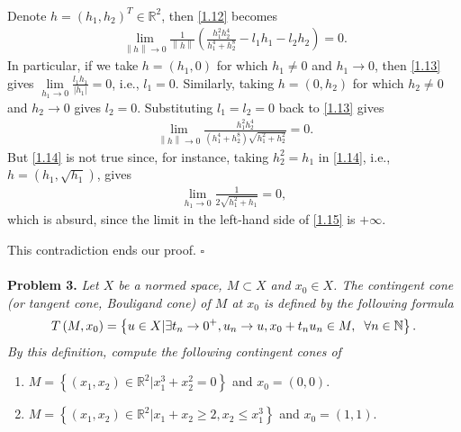\documentclass[a4paper]{article}
\numberwithin{equation}{section}
\begin{document}
\begin{enumerate}
\begin{align}
\end{align}
Denote $h=\left(h_1,h_2\right)^T \in \mathbb{R}^2$, then \eqref{1.12} becomes
\begin{align}
\label{1.13}
\mathop {\lim }\limits_{\left\| h \right\| \to 0} \frac{1}{{\left\| h \right\|}}\left( {\frac{{h_1^2h_2^4}}{{h_1^4 + h_2^8}} - {l_1}{h_1} - {l_2}{h_2}} \right) = 0.
\end{align}
In particular, if we take $h=\left(h_1,0\right)$ for which $h_1 \ne 0$ and $h_1\to 0$, then \eqref{1.13} gives $ \mathop {\lim }\limits_{{h_1} \to 0} \frac{{{l_1}{h_1}}}{{\left| {{h_1}} \right|}} = 0$, i.e., $l_1 =0$. Similarly, taking  $h=\left(0,h_2\right)$ for which $h_2 \ne 0$ and $h_2\to 0$ gives $l_2 =0$. Substituting $l_1=l_2=0$ back to \eqref{1.13} gives
\begin{align}
\label{1.14}
\mathop {\lim }\limits_{\left\| h \right\| \to 0} \frac{{h_1^2h_2^4}}{{\left( {h_1^4 + h_2^8} \right)\sqrt {h_1^2 + h_2^2} }} = 0.
\end{align}
But \eqref{1.14} is not true since, for instance, taking $h_2^2=h_1$ in \eqref{1.14}, i.e., $h=\left(h_1,\sqrt{h_1}\right)$, gives
\begin{align}
\label{1.15}
\mathop {\lim }\limits_{{h_1} \to 0} \frac{1}{{2\sqrt {h_1^2 + {h_1}} }} = 0,
\end{align}
which is absurd, since the limit in the left-hand side of \eqref{1.15} is $+\infty$. 
\end{enumerate}
This contradiction ends our proof. \hfill $\square$\\
\\
\textbf{Problem 3.} \textit{Let $X$ be a normed space, $M\subset X$ and $x_0\in X$. The contingent cone (or tangent cone, Bouligand cone) of $M$ at $x_0$ is defined by the following formula}
\begin{align}
\label{1.16}
T\left( {M,{x_0}} \right) = \left\{ {u \in X|\exists {t_n} \to {0^ + },{u_n} \to u,{x_0} + {t_n}{u_n} \in M,\hspace{0.2cm}\forall n \in \mathbb{N}} \right\}.
\end{align}
\textit{By this definition, compute the following contingent cones of}
\begin{enumerate}
\item $M = \left\{ {\left( {{x_1},{x_2}} \right) \in {\mathbb{R}^2}|x_1^3 + x_2^2 = 0} \right\}$ and $x_0 =\left(0,0\right)$.
\item $M = \left\{ {\left( {{x_1},{x_2}} \right) \in {\mathbb{R}^2}|{x_1} + {x_2} \ge 2,{x_2} \le x_1^3} \right\}$ and $x_0 =\left(1,1\right)$.
\end{enumerate}
\end{document}
